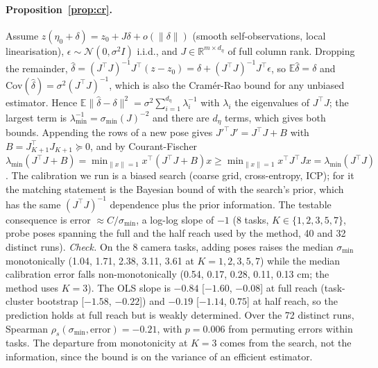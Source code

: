 \documentclass{article}
\begin{document}
\paragraph{Proposition~\ref{prop:cr}.} Assume $z(\eta_0 + \delta) = z_0 + J\delta + o(\|\delta\|)$ (smooth self-observations,
local linearisation), $\epsilon \sim \mathcal N(0, \sigma^2 I)$ i.i.d., and $J \in \mathbb{R}^{m\times d_\eta}$ of full
column rank. Dropping the remainder, $\hat\delta = (J^\top J)^{-1}J^\top(z - z_0) = \delta + (J^\top J)^{-1}J^\top\epsilon$,
so $\mathbb{E}\hat\delta = \delta$ and $\mathrm{Cov}(\hat\delta) = \sigma^2 (J^\top J)^{-1}$, which is also the
Cram\'er-Rao bound for any unbiased estimator. Hence $\mathbb{E}\|\hat\delta - \delta\|^2 = \sigma^2
\sum_{i=1}^{d_\eta} \lambda_i^{-1}$ with $\lambda_i$ the eigenvalues of $J^\top J$; the largest term is
$\lambda_{\min}^{-1} = \sigma_{\min}(J)^{-2}$ and there are $d_\eta$ terms, which gives both bounds. Appending the rows of a new pose gives $J'^\top J' = J^\top J + B$ with $B =
J_{K+1}^\top J_{K+1} \succeq 0$, and by Courant-Fischer $\lambda_{\min}(J^\top J + B) = \min_{\|x\|=1} x^\top(J^\top J +
B)x \ge \min_{\|x\|=1} x^\top J^\top J x = \lambda_{\min}(J^\top J)$. The calibration we run is a biased search
(coarse grid, cross-entropy, ICP); for it the matching statement is the Bayesian bound of \citet{vantrees} with the
search's prior, which has the same $(J^\top J)^{-1}$ dependence plus the prior information. The testable consequence is
error $\approx C/\sigma_{\min}$, a log-log slope of $-1$ (8 tasks,
$K \in \{1,2,3,5,7\}$, probe poses spanning the full and the half reach used by the method, 40 and 32 distinct runs).
\emph{Check.} On the 8 camera tasks, adding poses raises the median $\sigma_{\min}$ monotonically (1.04, 1.71, 2.38,
3.11, 3.61 at $K=1,2,3,5,7$) while the median calibration error falls non-monotonically (0.54, 0.17, 0.28, 0.11, 0.13
cm; the method uses $K=3$). The OLS slope is $-0.84$ [$-1.60$, $-0.08$] at full reach (task-cluster bootstrap
[$-1.58$, $-0.22$]) and $-0.19$ [$-1.14$, $0.75$] at half reach, so the prediction holds at full reach but is weakly
determined. Over
the 72 distinct runs, Spearman $\rho_s(\sigma_{\min}, \text{error}) = -0.21$, with $p = 0.006$ from permuting errors
within tasks. The departure from monotonicity at $K = 3$ comes from the search, not
the information, since the bound is on the variance of an efficient estimator.
\end{document}
